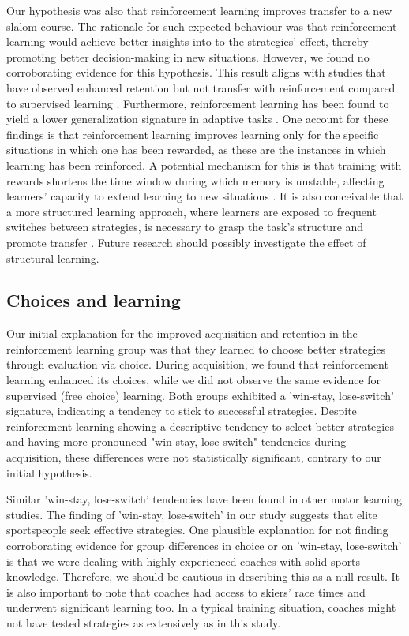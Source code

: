 \documentclass{article}
\begin{document}
Our hypothesis was also that reinforcement learning improves transfer to a new slalom course. The rationale for such expected behaviour was that reinforcement learning would achieve better insights into to the strategies' effect, thereby promoting better decision-making in new situations. However, we found no corroborating evidence for this hypothesis. This result aligns with studies that have observed enhanced retention but not transfer with reinforcement compared to supervised learning \cite{hasson_reinforcement_2015}. Furthermore, reinforcement learning has been found to yield a lower generalization signature in adaptive tasks \cite{lior_shmuelof_overcoming_2012}. One account for these findings is that reinforcement learning improves learning only for the specific situations in which one has been rewarded, as these are the instances in which learning has been reinforced. A potential mechanism for this is that training with rewards shortens the time window during which memory is unstable, affecting learners' capacity to extend learning to new situations \cite{robertson_memory_2018}. It is also conceivable that a more structured learning approach, where learners are exposed to frequent switches between strategies, is necessary to grasp the task's structure and promote transfer \cite{braun_structure_2010}. Future research should possibly investigate the effect of structural learning. 

\subsection{Choices and learning}
Our initial explanation for the improved acquisition and retention in the reinforcement learning group was that they learned to choose better strategies through evaluation via choice. During acquisition, we found that reinforcement learning enhanced its choices, while we did not observe the same evidence for supervised (free choice) learning. Both groups exhibited a 'win-stay, lose-switch' signature, indicating a tendency to stick to successful strategies. Despite reinforcement learning showing a descriptive tendency to select better strategies and having more pronounced "win-stay, lose-switch" tendencies during acquisition, these differences were not statistically significant, contrary to our initial hypothesis. 

Similar 'win-stay, lose-switch' tendencies have been found in other motor learning studies. The finding of 'win-stay, lose-switch' in our study suggests that elite sportspeople seek effective strategies. One plausible explanation for not finding corroborating evidence for group differences in choice or on 'win-stay, lose-switch' is that we were dealing with highly experienced coaches with solid sports knowledge. Therefore, we should be cautious in describing this as a null result. It is also important to note that coaches had access to skiers' race times and underwent significant learning too. In a typical training situation, coaches might not have tested strategies as extensively as in this study.  
\end{document}
